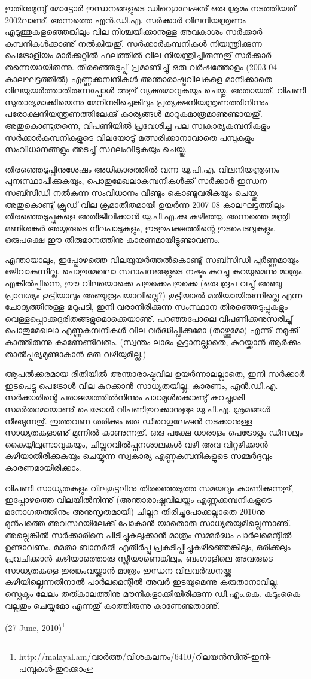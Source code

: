 ഇതിനുമുമ്പു് മോട്ടോര്‍ ഇന്ധനങ്ങളുടെ ഡിറെഗുലേഷനു് ഒരു ശ്രമം നടത്തിയത് 2002ലാണു്. അന്നത്തെ 
എന്‍.ഡി.എ. സര്‍ക്കാര്‍ വിലനിയന്ത്രണം എടുത്തുകളഞ്ഞെങ്കിലും വില നിശ്ചയിക്കാനുള്ള അവകാശം സര്‍ക്കാര്‍ 
കമ്പനികള്‍ക്കാണു് നല്‍കിയതു്. സര്‍ക്കാര്‍കമ്പനികള്‍ നിയന്ത്രിക്കുന്ന പെട്രോളിയം മാര്‍ക്കറ്റില്‍ ഫലത്തില്‍ വില 
നിയന്ത്രിച്ചിരുന്നതു് സര്‍ക്കാര്‍ തന്നെയായിരുന്നു. തിരഞ്ഞെടുപ്പു് പ്രമാണിച്ചു് ഒരു വര്‍ഷത്തോളം (2003-04 
കാലഘട്ടത്തില്‍) എണ്ണക്കമ്പനികള്‍ അന്താരാഷ്ട്രവിലകളെ മാനിക്കാതെ വിലയുയര്‍ത്താതിരുന്നപ്പോള്‍ 
അതു് വ്യക്തമാവുകയും ചെയ്തു. അതായത്, വിപണി സുതാര്യമാക്കിയെന്നു മേനിനടിച്ചെങ്കിലും പ്രത്യക്ഷനിയന്ത്രണത്തിനിന്നും പരോക്ഷനിയന്ത്രണത്തിലേക്കു് കാര്യങ്ങള്‍ മാറുകമാത്രമാണുണ്ടായതു്. അതുകൊണ്ടുതന്നെ, വിപണിയില്‍ 
പ്രവേശിച്ച പല സ്വകാര്യകമ്പനികളും സര്‍ക്കാര്‍കമ്പനികളുടെ വിലയോടു് മത്സരിക്കാനാവാതെ പമ്പുകളും 
സംവിധാനങ്ങളും അടച്ചു് സ്ഥലംവിടുകയും ചെയ്തു.

തിരഞ്ഞെടുപ്പിനുശേഷം അധികാരത്തില്‍ വന്ന യു.പി.എ. വിലനിയന്ത്രണം പുനഃസ്ഥാപിക്കുകയും, 
പൊതുമേഖലാകമ്പനികള്‍ക്ക് സര്‍ക്കാര്‍ ഇന്ധന സബ്സിഡി നല്‍കുന്ന സംവിധാനം വീണ്ടും കൊണ്ടുവരികയും 
ചെയ്തു. അതുകൊണ്ടു് ക്രൂഡ് വില ക്രമാതീതമായി ഉയര്‍ന്ന 2007-08 കാലഘട്ടത്തിലും തിരഞ്ഞെടുപ്പുകളെ 
അതിജീവിക്കാന്‍ യു.പി.എ.ക്കു കഴിഞ്ഞു. അന്നത്തെ മന്ത്രി മണിശങ്കര്‍ അയ്യരുടെ നിലപാടുകളും, ഇടതുപക്ഷത്തിന്റെ 
ഇടപെടലുകളും, ഒരുപക്ഷെ ഈ തീരുമാനത്തിനു കാരണമായിട്ടുണ്ടാവണം.

എന്തായാലും, ഇപ്പോഴത്തെ വിലയുയര്‍ത്തല്‍കൊണ്ടു് സബ്സിഡി പുര്‍ണ്ണമായും ഒഴിവാകുന്നില്ല. പൊതുമേഖലാ 
സ്ഥാപനങ്ങളുടെ നഷ്ടം കുറച്ചു കുറയുമെന്നു മാത്രം. എങ്കില്‍പ്പിന്നെ, ഈ വിലയൊക്കെ പതുക്കെപതുക്കെ (ഒരു രൂപ 
വച്ചു് അഞ്ചു പ്രാവശ്യം കൂട്ടിയാലും അഞ്ചുരൂപയാവില്ലെ?) കൂട്ടിയാല്‍ മതിയായിരുന്നില്ലെ എന്ന ചോദ്യത്തിനുള്ള മറുപടി, 
ഇനി വരാനിരിക്കുന്ന സംസ്ഥാന തിരഞ്ഞെടുപ്പുകളും വെള്ളപ്പൊക്കദുരിതങ്ങളുമൊക്കെയാണു്. പറഞ്ഞപോലെ 
വിപണിക്കനുസരിച്ചു് പൊതുമേഖലാ എണ്ണകമ്പനികള്‍ വില വര്‍ദ്ധിപ്പിക്കുമോ (താഴ്ത്തുമോ) എന്നു് നമുക്കു് കാത്തിരുന്നു 
കാണേണ്ടിവരും. (സ്വന്തം ലാഭം കൂട്ടാനല്ലാതെ, കുറയ്ക്കാന്‍ ആര്‍ക്കും താല്‍പ്പര്യമുണ്ടാകാന്‍ ഒരു വഴിയുമില്ല.)

ആപല്‍ക്കരമായ രീതിയില്‍ അന്താരാഷ്ട്രവില ഉയര്‍ന്നാലല്ലാതെ, ഇനി സര്‍ക്കാര്‍ ഇടപെട്ടു പെട്രോള്‍ വില കുറക്കാന്‍
സാധ്യതയില്ല. കാരണം, എന്‍.ഡി.എ. സര്‍ക്കാരിന്റെ പരാജയത്തില്‍നിന്നും പാഠമുള്‍ക്കൊണ്ടു് കുറച്ചുകൂടി 
സമര്‍ത്ഥമായാണു് പെട്രോള്‍ വിപണിതുറക്കാനുള്ള യു.പി.എ. ശ്രമങ്ങള്‍ നീങ്ങുന്നതു്. ഇത്തവണ ശരിക്കും ഒരു 
ഡിറെഗുലേഷന്‍ നടക്കാനുള്ള സാധ്യതകളാണു് മുന്നില്‍ കാണുന്നതു്. ഒരു പക്ഷേ ധാരാളം പെട്രോളും ഡീസലും 
കൈയ്യിലുണ്ടാവുകയും, ചില്ലറവില്‍പ്പനശാലകള്‍ വഴി അവ വിറ്റഴിക്കാന്‍ കഴിയാതിരിക്കുകയും ചെയ്യുന്ന സ്വകാര്യ 
എണ്ണകമ്പനികളുടെ സമ്മര്‍ദ്ദവും കാരണമായിരിക്കാം.

വിപണി സാധ്യതകളും വിലകൂട്ടലിനു തിരഞ്ഞെടുത്ത സമയവും കാണിക്കുന്നതു്, ഇപ്പോഴത്തെ വിലയില്‍നിന്നു് 
(അന്താരാഷ്ട്രവിലയ്ക്കും എണ്ണക്കമ്പനികളുടെ മനോഗതത്തിനും അനുസൃതമായി) ചില്ലറ തിരിച്ചുപോക്കല്ലാതെ 2010നു 
മുന്‍പത്തെ അവസ്ഥയിലേക്കു് പോകാന്‍ യാതൊരു സാധ്യതയുമില്ലെന്നാണു്. അല്ലെങ്കില്‍ സര്‍ക്കാരിനെ 
പിടിച്ചുകുലുക്കാന്‍ മാത്രം സമ്മര്‍ദ്ധം പാര്‍ലമെന്റില്‍ ഉണ്ടാവണം. മമതാ ബാനര്‍ജി എതിര്‍പ്പു പ്രകടിപ്പിച്ചുകഴിഞ്ഞെങ്കിലും,
ഒരിക്കലും പ്രവചിക്കാന്‍ കഴിയാത്തൊരു സ്ത്രീയാണെങ്കിലും, ബംഗാളിലെ അവരുടെ സാധ്യതകളെ തുരങ്കംവയ്ക്കാന്‍ മാത്രം
ഇന്ധന വിലവര്‍ദ്ധനയ്ക്കു കഴിയില്ലെന്നതിനാല്‍ പാര്‍ലമെന്റില്‍ അവര്‍ ഇടയുമെന്നു കരുതാനാവില്ല. സ്പെക്ട്രം ലേലം
തത്കാലത്തിനു മൗനികളാക്കിയിരിക്കുന്ന ഡി.എം.കെ. കടുംകൈ വല്ലതും ചെയ്യുമോ എന്നതു് കാത്തിരുന്നു 
കാണേണ്ടതാണു്.

\begin{flushright}(27 June, 2010)\footnote{http://malayal.am/വാര്‍ത്ത/വിശകലനം/6410/റിലയന്‍സിനു്-ഇനി-പമ്പുകള്‍-തുറക്കാം}\end{flushright}

\newpage
